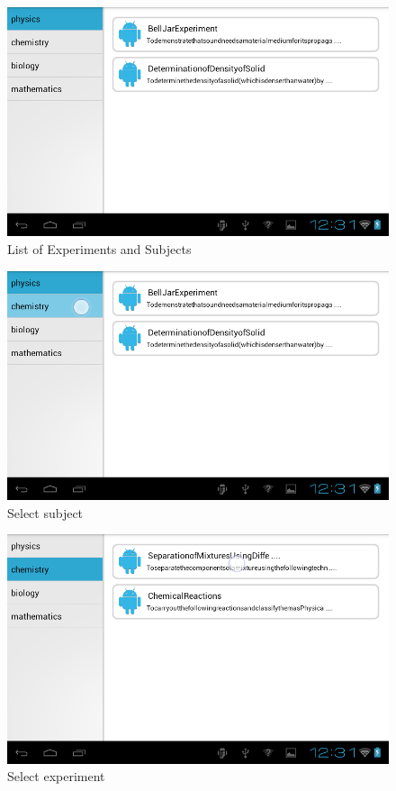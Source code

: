 \documentclass[12pt]{report}
\begin{document}
\begin{figure}[H]
 \centering
 \includegraphics[width=15cm]{./13.png}
 \caption{List of Experiments and Subjects \label{fig:13}}
\end{figure}

\begin{figure}[H]
 \centering
 \includegraphics[width=15cm]{./14.png}
 \caption{Select subject\label{fig:14}}
\end{figure}

\begin{figure}[H]
 \centering
 \includegraphics[width=15cm]{./16.png}
 \caption{Select experiment\label{fig:16}}
\end{figure}
\end{document}
